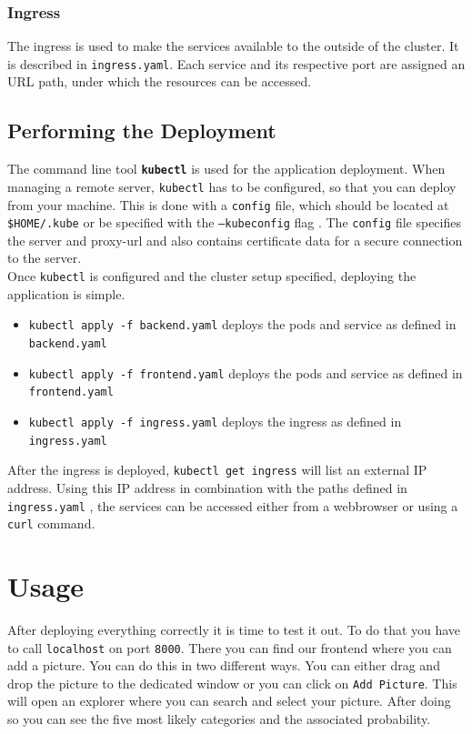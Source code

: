         \subsubsection{Ingress}
            The ingress is used to make the services available to the outside of the cluster.
            It is described in \texttt{ingress.yaml}.
            Each service and its respective port are assigned an URL path, under which the resources can be accessed. 
        
    \subsection{Performing the Deployment}
        The command line tool \textbf{\texttt{kubectl}} is used for the application deployment.
        When managing a remote server, \texttt{kubectl} has to be configured, so that you can deploy from your machine.
        This is done with a \texttt{config} file, which should be located at \texttt{\$HOME/.kube} or be specified with the \texttt{--kubeconfig} flag \cite{Kubernetes_kubeconfig:2022}.
        The \texttt{config} file specifies the server and proxy-url and also contains certificate data for a secure connection to the server.
        \medskip\\
        Once \texttt{kubectl} is configured and the cluster setup specified, deploying the application is simple.
        \begin{itemize}
            \item \texttt{kubectl apply -f backend.yaml} deploys the pods and service as defined in \texttt{backend.yaml}
            \item \texttt{kubectl apply -f frontend.yaml} deploys the pods and service as defined in \texttt{frontend.yaml}
             \item \texttt{kubectl apply -f ingress.yaml} deploys the ingress as defined in \texttt{ingress.yaml}
        \end{itemize}
        After the ingress is deployed, \texttt{kubectl get ingress} will list an external IP address.
        Using this IP address in combination with the paths defined in \texttt{ingress.yaml} , the services can be accessed either from a webbrowser or using a \texttt{curl} command.
    
\section{Usage}
After deploying everything correctly it is time to test it out. To do that you have to call \texttt{localhost} on port \texttt{8000}. There you can find our frontend where you can add a picture. You can do this in two different ways. You can either drag and drop the picture to the dedicated window or you can click on \texttt{Add Picture}. This will open an explorer where you can search and select your picture. After doing so you can see the five most likely categories and the associated probability.